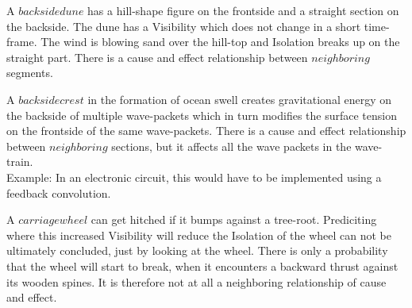 \documentclass{report}
\begin{document}
A $backside dune$ has a hill-shape figure on the frontside and a straight section on the backside. The dune has a Visibility which does not change in a short time-frame. The wind is blowing sand over the hill-top and Isolation breaks up on the straight part. There is a cause and effect relationship between $neighboring$ segments.

A $backside crest$ in the formation of ocean swell creates gravitational energy on the backside of multiple wave-packets which in turn modifies the surface tension on the frontside of the same wave-packets. There is a cause and effect relationship between $neighboring$ sections, but it affects all the wave packets in the wave-train.\\
Example: In an electronic circuit, this would have to be implemented using a feedback convolution.

A $carriage wheel$ can get hitched if it bumps against a tree-root. Prediciting where this increased Visibility will reduce the Isolation of the wheel can not be ultimately concluded, just by looking at the wheel. There is only a probability that the wheel will start to break, when it encounters a backward thrust against its wooden spines. It is therefore not at all a neighboring relationship of cause and effect.
\end{document}
